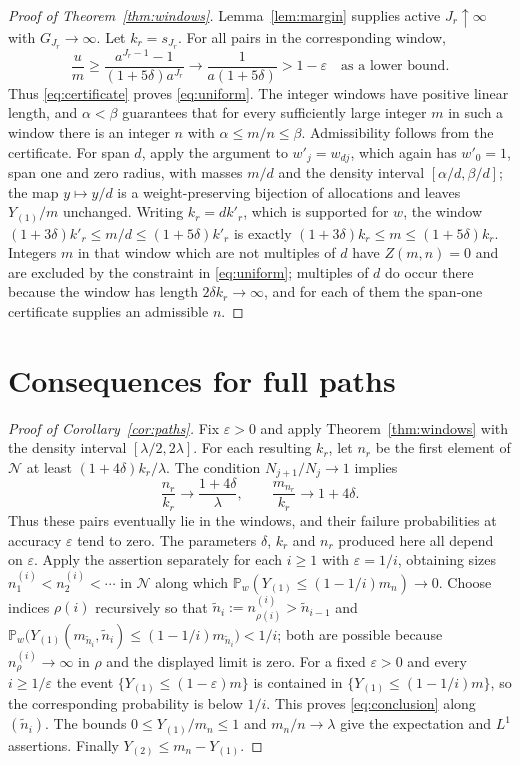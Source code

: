 \documentclass[11pt]{amsart}
\theoremstyle{remark}\newtheorem{remark}[theorem]{Remark}
\newcommand{\Pp}{\mathbb P}
\begin{document}
\begin{proof}[Proof of Theorem~\ref{thm:windows}]
Lemma~\ref{lem:margin} supplies active $J_r\uparrow\infty$ with
$G_{J_r}\to\infty$. Let $k_r=s_{J_r}$. For all pairs in the corresponding
window,
\[
 \frac{u}{m}\ge\frac{a^{J_r-1}-1}{(1+5\delta)a^{J_r}}
 \longrightarrow\frac1{a(1+5\delta)}>1-\varepsilon
 \quad\text{as a lower bound}.
\]
Thus \eqref{eq:certificate} proves \eqref{eq:uniform}. The integer windows
have positive linear length, and $\alpha<\beta$ guarantees that for every
sufficiently large integer $m$ in such a window there is an integer $n$
with $\alpha\le m/n\le\beta$. Admissibility follows from the certificate.
For span $d$, apply the argument to $w'_j=w_{dj}$, which again has
$w'_0=1$, span one and zero radius, with masses $m/d$ and the density interval
$[\alpha/d,\beta/d]$; the map $y\mapsto y/d$ is a weight-preserving bijection
of allocations and leaves $Y_{(1)}/m$ unchanged. Writing $k_r=dk'_r$, which is
supported for $w$, the window $(1+3\delta)k'_r\le m/d\le(1+5\delta)k'_r$ is
exactly $(1+3\delta)k_r\le m\le(1+5\delta)k_r$. Integers $m$ in that window
which are not multiples of $d$ have $Z(m,n)=0$ and are excluded by the
constraint in \eqref{eq:uniform}; multiples of $d$ do occur there because the
window has length $2\delta k_r\to\infty$, and for each of them the span-one
certificate supplies an admissible $n$.
\end{proof}

\section{Consequences for full paths}\label{sec:paths}
\begin{proof}[Proof of Corollary~\ref{cor:paths}]
Fix $\varepsilon>0$ and apply Theorem~\ref{thm:windows} with the density
interval $[\lambda/2,2\lambda]$. For each resulting $k_r$, let $n_r$ be the
first element of $\mathcal N$ at least $(1+4\delta)k_r/\lambda$.
The condition $N_{j+1}/N_j\to1$ implies
\[
 \frac{n_r}{k_r}\to\frac{1+4\delta}{\lambda},\qquad
 \frac{m_{n_r}}{k_r}\to1+4\delta.
\]
Thus these pairs eventually lie in the windows, and their failure
probabilities at accuracy $\varepsilon$ tend to zero. The parameters
$\delta$, $k_r$ and $n_r$ produced here all depend on $\varepsilon$. Apply the
assertion separately for each $i\ge1$ with $\varepsilon=1/i$, obtaining sizes
$n^{(i)}_1<n^{(i)}_2<\cdots$ in $\mathcal N$ along which
$\Pp_w(Y_{(1)}\le(1-1/i)m_n)\to0$. Choose indices $\rho(i)$ recursively so that
$\tilde n_i:=n^{(i)}_{\rho(i)}>\tilde n_{i-1}$ and
$\Pp_w\bigl(Y_{(1)}(m_{\tilde n_i},\tilde n_i)\le(1-1/i)m_{\tilde n_i}\bigr)<1/i$;
both are possible because $n^{(i)}_\rho\to\infty$ in $\rho$ and the displayed
limit is zero. For a fixed $\varepsilon>0$ and every $i\ge1/\varepsilon$ the
event $\{Y_{(1)}\le(1-\varepsilon)m\}$ is contained in
$\{Y_{(1)}\le(1-1/i)m\}$, so the corresponding probability is below $1/i$.
This proves \eqref{eq:conclusion} along $(\tilde n_i)$. The bounds $0\le Y_{(1)}/m_n\le1$ and
$m_n/n\to\lambda$ give the expectation and $L^1$ assertions. Finally
$Y_{(2)}\le m_n-Y_{(1)}$.
\end{proof}
\end{document}
